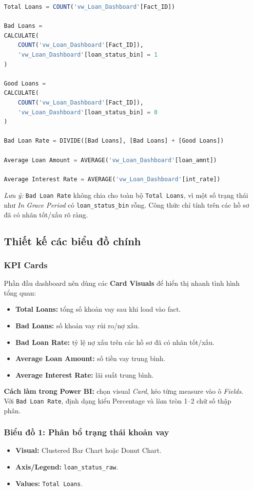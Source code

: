 \begin{lstlisting}[language=SQL, caption=Measure DAX sử dụng trong Dashboard]
Total Loans = COUNT('vw_Loan_Dashboard'[Fact_ID])

Bad Loans =
CALCULATE(
    COUNT('vw_Loan_Dashboard'[Fact_ID]),
    'vw_Loan_Dashboard'[loan_status_bin] = 1
)

Good Loans =
CALCULATE(
    COUNT('vw_Loan_Dashboard'[Fact_ID]),
    'vw_Loan_Dashboard'[loan_status_bin] = 0
)

Bad Loan Rate = DIVIDE([Bad Loans], [Bad Loans] + [Good Loans])

Average Loan Amount = AVERAGE('vw_Loan_Dashboard'[loan_amnt])

Average Interest Rate = AVERAGE('vw_Loan_Dashboard'[int_rate])
\end{lstlisting}

\textit{Lưu ý:} \texttt{Bad Loan Rate} không chia cho toàn bộ \texttt{Total Loans}, vì một số trạng thái như \textit{In Grace Period} có \texttt{loan\_status\_bin} rỗng. Công thức chỉ tính trên các hồ sơ đã có nhãn tốt/xấu rõ ràng.

\subsection{Thiết kế các biểu đồ chính}
\subsubsection{KPI Cards}
Phần đầu dashboard nên dùng các \textbf{Card Visuals} để hiển thị nhanh tình hình tổng quan:
\begin{itemize}
    \item \textbf{Total Loans:} tổng số khoản vay sau khi load vào fact.
    \item \textbf{Bad Loans:} số khoản vay rủi ro/nợ xấu.
    \item \textbf{Bad Loan Rate:} tỷ lệ nợ xấu trên các hồ sơ đã có nhãn tốt/xấu.
    \item \textbf{Average Loan Amount:} số tiền vay trung bình.
    \item \textbf{Average Interest Rate:} lãi suất trung bình.
\end{itemize}

\textbf{Cách làm trong Power BI:} chọn visual \textit{Card}, kéo từng measure vào ô \textit{Fields}. Với \texttt{Bad Loan Rate}, định dạng kiểu Percentage và làm tròn 1--2 chữ số thập phân.

\subsubsection{Biểu đồ 1: Phân bổ trạng thái khoản vay}
\begin{itemize}
    \item \textbf{Visual:} Clustered Bar Chart hoặc Donut Chart.
    \item \textbf{Axis/Legend:} \texttt{loan\_status\_raw}.
    \item \textbf{Values:} \texttt{Total Loans}.
\end{itemize}

